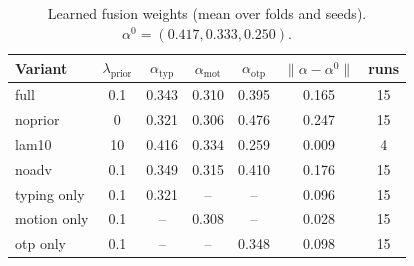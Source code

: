 \begin{table}[t]
\caption{Learned fusion weights (mean over folds and seeds). $\alpha^0 = (0.417, 0.333, 0.250)$.}
\label{tab:alpha}
\centering
\small
\begin{tabular}{lcccccc}
\toprule
Variant & $\lambda_{\text{prior}}$ & $\alpha_{\text{typ}}$ & $\alpha_{\text{mot}}$ & $\alpha_{\text{otp}}$ & $\|\alpha-\alpha^0\|$ & runs \\
\midrule
full & 0.1 & 0.343 & 0.310 & 0.395 & 0.165 & 15 \\
noprior & 0 & 0.321 & 0.306 & 0.476 & 0.247 & 15 \\
lam10 & 10 & 0.416 & 0.334 & 0.259 & 0.009 & 4 \\
noadv & 0.1 & 0.349 & 0.315 & 0.410 & 0.176 & 15 \\
typing only & 0.1 & 0.321 & -- & -- & 0.096 & 15 \\
motion only & 0.1 & -- & 0.308 & -- & 0.028 & 15 \\
otp only & 0.1 & -- & -- & 0.348 & 0.098 & 15 \\
\bottomrule
\end{tabular}
\end{table}
